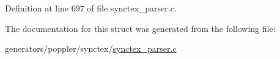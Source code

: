 Definition at line 697 of file synctex\+\_\+parser.\+c.



The documentation for this struct was generated from the following file\+:\begin{DoxyCompactItemize}
\item 
generators/poppler/synctex/\hyperlink{synctex__parser_8c}{synctex\+\_\+parser.\+c}\end{DoxyCompactItemize}
